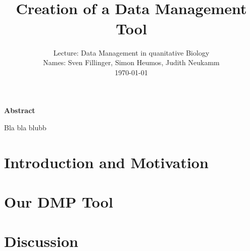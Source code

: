 \documentclass[paper=a4, fontsize=11pt]{scrartcl}	%
\title{
		\usefont{OT1}{bch}{b}{n}
		\horrule{0.5pt} \\[0.4cm]
		\LARGE Creation of a Data Management Tool
		\horrule{2pt} \\%
}
\author{
		\normalfont 								\normalsize
			Lecture: Data Management in quanitative Biology\\					\normalsize
     		Names: Sven Fillinger, Simon Heumos, Judith Neukamm\\					\normalsize
       		 \today
}
\date{}
\numberwithin{equation}{section}		%
\numberwithin{figure}{section}			%
\numberwithin{table}{section}				%
\begin{document}
\maketitle

\centerline{\bf Abstract}
Bla bla blubb
\noindent

\newpage

\section{Introduction and Motivation}

\section{Our DMP Tool}

\section{Discussion}



\newpage


\end{document}
